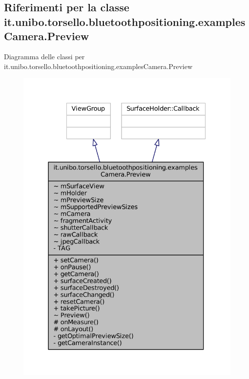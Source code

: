 \hypertarget{classit_1_1unibo_1_1torsello_1_1bluetoothpositioning_1_1examplesCamera_1_1Preview}{}\subsection{Riferimenti per la classe it.\+unibo.\+torsello.\+bluetoothpositioning.\+examples\+Camera.\+Preview}
\label{classit_1_1unibo_1_1torsello_1_1bluetoothpositioning_1_1examplesCamera_1_1Preview}


Diagramma delle classi per it.\+unibo.\+torsello.\+bluetoothpositioning.\+examples\+Camera.\+Preview
\nopagebreak
\begin{figure}[H]
\begin{center}
\leavevmode
\includegraphics[width=331pt]{classit_1_1unibo_1_1torsello_1_1bluetoothpositioning_1_1examplesCamera_1_1Preview__inherit__graph}
\end{center}
\end{figure}


